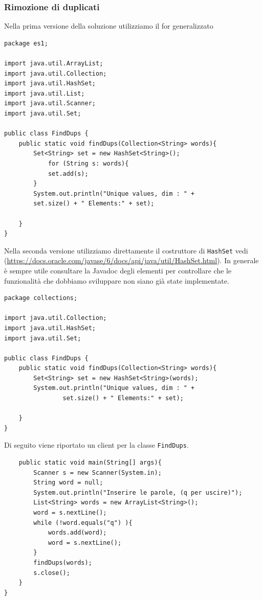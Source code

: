 \documentclass{article}
\begin{document}
\subsubsection{Rimozione di duplicati}

Nella prima versione della soluzione utilizziamo il for generalizzato
\begin{lstlisting}
package es1;

import java.util.ArrayList;
import java.util.Collection;
import java.util.HashSet;
import java.util.List;
import java.util.Scanner;
import java.util.Set;

public class FindDups {
	public static void findDups(Collection<String> words){
	    Set<String> set = new HashSet<String>();
	        for (String s: words){
			set.add(s);
		}
		System.out.println("Unique values, dim : " + 
		set.size() + " Elements:" + set);
			
	}
}
\end{lstlisting}

Nella seconda versione utilizziamo direttamente il costruttore di \texttt{HashSet} vedi (\url{https://docs.oracle.com/javase/6/docs/api/java/util/HashSet.html}). In generale \`e sempre utile consultare la Javadoc degli elementi per controllare che le funzionalit\`a che dobbiamo sviluppare non siano gi\`a state implementate.
\begin{lstlisting}
package collections;

import java.util.Collection;
import java.util.HashSet;
import java.util.Set;

public class FindDups {
	public static void findDups(Collection<String> words){
		Set<String> set = new HashSet<String>(words);
		System.out.println("Unique values, dim : " + 
				set.size() + " Elements:" + set);
		
	}
}
\end{lstlisting}
Di seguito viene riportato un client per la classe \texttt{FindDups}.
\begin{lstlisting}
	public static void main(String[] args){
		Scanner s = new Scanner(System.in);
		String word = null;
		System.out.println("Inserire le parole, (q per uscire)");
		List<String> words = new ArrayList<String>();
		word = s.nextLine();		
		while (!word.equals("q") ){
			words.add(word);
			word = s.nextLine();
		} 
		findDups(words);
		s.close();
	}
}
\end{lstlisting}
\end{document}
